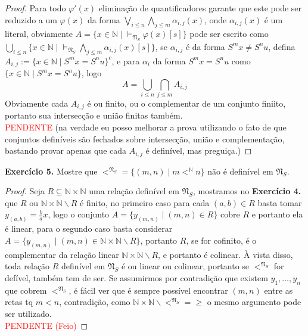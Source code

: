 \documentclass[11pt]{article}
\newcommand{\mf}[1]{\mathfrak{#1}}
\newcommand{\mbb}[1]{\mathbb{#1}}
\begin{document}
\begin{proof}
    Para todo $\varphi'(x)$ eliminação de quantificadores garante que este pode ser reduzido a um $\varphi(x)$ da forma $\bigvee_{i\leq n}\bigwedge_{j\leq m}\alpha_{i,j}(x)$, onde $\alpha_{i,j}(x)$ é um literal, obviamente $A=\{x\in\mbb{N}\mid\vDash_{\mf{N}_S}\varphi(x)[s]\}$ pode ser escrito como $\bigcup_{i\leq n}\{x\in\mbb{N}\mid\vDash_{\mf{N}_S}\bigwedge_{j\leq m}\alpha_{i,j}(x)[s]\}$, se $\alpha_{i,j}$ é da forma $S^mx\neq S^nu$, defina $A_{i,j}:=\{x\in\mbb{N}\mid S^mx=S^nu\}^c$, e para $\alpha_i$ da forma $S^mx=S^nu$ como $\{x\in\mbb{N}\mid S^mx=S^nu\}$, logo $$A=\bigcup_{i\leq n}\bigcap_{j\leq m}A_{i,j}$$
    Obviamente cada $A_{i,j}$ é ou finito, ou o complementar de um conjunto finiito, portanto sua intersecção e união finitas também.\\
    \textcolor{red}{PENDENTE} (na verdade eu posso melhorar a prova utilizando o fato de que conjuntos definíveis são fechados sobre intersecção, união e complementação, bastando provar apenas que cada $A_{i,j}$ é definível, mas preguiça.)
\end{proof}

\begin{shaded}
\textbf{Exercício 5.} Mostre que $<^{\mf{N}_S}=\{(m,n)\mid m<^\mbb{N}n\}$ não é definível em $\mf{N}_S$.
\end{shaded}

\begin{proof}
    Seja $R\subseteq\mbb{N}\times\mbb{N}$ uma relação definível em $\mf{N}_S$, mostramos no \textbf{Exercício 4.} que $R$ ou $\mbb{N}\times\mbb{N}\backslash R$ é finito, no primeiro caso para cada $(a,b)\in R$ basta tomar $y_{(a,b)}=\frac{b}{a}x$, logo o conjunto $A=\{y_{(m,n)}\mid (m,n)\in R\}$ cobre $R$ e portanto ela é linear, para o segundo caso basta considerar $A=\{y_{(m,n)}\mid (m,n)\in\mbb{N}\times\mbb{N}\backslash R\}$, portanto $R$, se for cofinito, é o complementar da relação linear $\mbb{N}\times\mbb{N}\backslash R$, e portanto é colinear. À vista disso, toda relação $R$ definível em $\mf{N}_S$ é ou linear ou colinear, portanto se $<^{\mf{N}_S}$ for defível, também tem de ser. Se assumirmos por contradição que existem $y_1,\dots,y_n$ que cobrem $<^{\mf{N}_S}$, é fácil ver que é sempre possível encontrar $(m,n)$ entre as retas tq $m<n$, contradição, como $\mbb{N}\times\mbb{N}\backslash<^{\mf{N}_S}=\geq$ o mesmo argumento pode ser utilizado.\\
    \textcolor{red}{PENDENTE (Feio)}
\end{proof}
\end{document}
